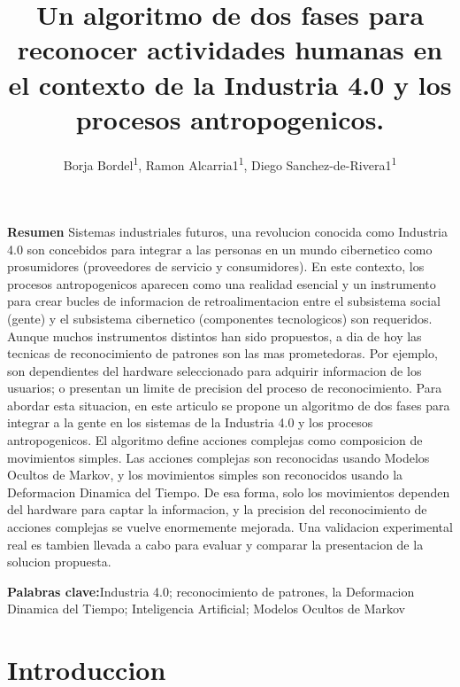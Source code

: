 \documentclass{paper}
\title{Un algoritmo de dos fases para reconocer actividades humanas en el contexto de la Industria 4.0 y los procesos antropogenicos.}
\author{Borja Bordel\textsuperscript{1}, Ramon Alcarria1\textsuperscript{1}, Diego Sanchez-de-Rivera1\textsuperscript{1}}
\begin{document}
\textbf{Resumen} Sistemas industriales futuros, una revolucion conocida como Industria 4.0 son concebidos para integrar a las personas en un mundo cibernetico como prosumidores (proveedores de servicio y consumidores). En este contexto, los procesos antropogenicos aparecen como una realidad esencial y un instrumento para crear bucles de informacion de retroalimentacion entre el subsistema social (gente) y el subsistema cibernetico (componentes tecnologicos) son requeridos. Aunque muchos instrumentos distintos han sido propuestos, a dia de hoy las tecnicas de reconocimiento de patrones  son las mas prometedoras. Por ejemplo, son dependientes del hardware seleccionado para adquirir informacion de los usuarios; o presentan un limite de precision del proceso de reconocimiento. Para abordar esta situacion, en este articulo se propone un algoritmo de dos fases para integrar a la gente en los sistemas de la Industria 4.0 y los procesos antropogenicos. El algoritmo define acciones complejas como composicion de movimientos simples. Las acciones complejas son reconocidas usando Modelos Ocultos de Markov, y los movimientos simples son reconocidos usando la Deformacion Dinamica del Tiempo. De esa forma, solo los movimientos dependen del hardware para captar la informacion, y la precision del reconocimiento de acciones complejas se vuelve enormemente mejorada. Una validacion experimental real es tambien llevada a cabo para evaluar y comparar la presentacion de la solucion propuesta.

\bigskip
\textbf{Palabras clave:}Industria 4.0; reconocimiento de patrones, la Deformacion Dinamica del Tiempo; Inteligencia Artificial; Modelos Ocultos de Markov



\section{Introduccion}
\end{document}
